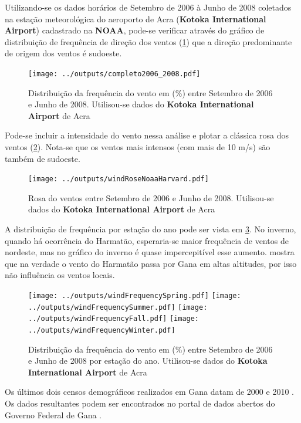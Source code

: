 Utilizando-se os dados horários de Setembro de 2006 à Junho de 2008 
coletados na estação meteorológica do aeroporto de Acra 
(\textbf{Kotoka International Airport}) cadastrado na \textbf{NOAA},
pode-se verificar através do gráfico de distribuição de frequência de
direção dos ventos (\ref{fg:windFrequencyCompleto}) que a direção 
predominante de origem dos ventos é sudoeste.
 
\begin{figure}[H]
  \centering
  \texttt{[image: ../outputs/completo2006\_2008.pdf]}
  \caption{Distribuição da frequência do vento em (\%) entre
           Setembro de 2006 e Junho de 2008. Utilisou-se dados 
           do \textbf{Kotoka International Airport} de Acra \label{fg:windFrequencyCompleto}}
\end{figure}

Pode-se incluir a intensidade do vento nessa análise e plotar a
clássica rosa dos ventos (\ref{fg:rosaCompleta}). Nota-se que os ventos
mais intensos (com mais de 10 m/s) são também de sudoeste. 

\begin{figure}[H]
  \centering
  \texttt{[image: ../outputs/windRoseNoaaHarvard.pdf]}
  \caption{Rosa do ventos entre
           Setembro de 2006 e Junho de 2008. Utilisou-se dados 
           do \textbf{Kotoka International Airport} de Acra \label{fg:rosaCompleta}}
\end{figure}

A distribuição de frequência por estação do ano pode ser vista em 
\ref{fg:windFrequencyStation}. 
No inverno, quando há ocorrência do Harmatão, esperaria-se maior
frequência de ventos de nordeste, mas no gráfico do inverno é quase 
impercepitível esse aumento. \citep{breuning2005} mostra que na 
verdade o vento do Harmatão passa por Gana em altas altitudes, por isso
não influência os ventos locais. 

\begin{figure}[H]
  \centering
  \texttt{[image: ../outputs/windFrequencySpring.pdf]}
  \texttt{[image: ../outputs/windFrequencySummer.pdf]}
  \texttt{[image: ../outputs/windFrequencyFall.pdf]}
  \texttt{[image: ../outputs/windFrequencyWinter.pdf]}
  \caption{Distribuição da frequência do vento em (\%) entre
           Setembro de 2006 e Junho de 2008 por estação do ano. Utilisou-se dados 
           do \textbf{Kotoka International Airport} de Acra \label{fg:windFrequencyStation}}
\end{figure}

Os últimos dois censos demográficos realizados em Gana datam
de 2000 \citep{ghanacensus2003} e 2010 \citep{ghanacensus2013}. Os
dados resultantes podem ser encontrados no portal de dados abertos
do Governo Federal de Gana \citep{opendataghana}.

